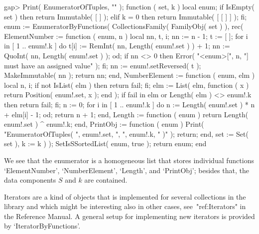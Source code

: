 \beginexample
gap> Print( EnumeratorOfTuples, "\n" );
function ( set, k )
    local  enum;
    if IsEmpty( set )  then
        return Immutable( [  ] );
    elif k = 0  then
        return Immutable( [ [  ] ] );
    fi;
    enum := EnumeratorByFunctions( CollectionsFamily( FamilyObj( set ) ), rec(
          ElementNumber := function ( enum, n )
                local  nn, t, i;
                nn := n - 1;
                t := [  ];
                for i  in [ 1 .. enum!.k ]  do
                    t[i] := RemInt( nn, Length( enum!.set ) ) + 1;
                    nn := QuoInt( nn, Length( enum!.set ) );
                od;
                if nn <> 0  then
                    Error( "<enum>[", n, "] must have an assigned value" );
                fi;
                nn := enum!.set{Reversed( t )};
                MakeImmutable( nn );
                return nn;
            end,
          NumberElement := function ( enum, elm )
                local  n, i;
                if not IsList( elm )  then
                    return fail;
                fi;
                elm := List( elm, function ( x )
                        return Position( enum!.set, x );
                    end );
                if fail in elm or Length( elm ) <> enum!.k  then
                    return fail;
                fi;
                n := 0;
                for i  in [ 1 .. enum!.k ]  do
                    n := Length( enum!.set ) * n + elm[i] - 1;
                od;
                return n + 1;
            end,
          Length := function ( enum )
                return Length( enum!.set ) ^ enum!.k;
            end,
          PrintObj := function ( enum )
                Print( "EnumeratorOfTuples( ", enum!.set, ", ", enum!.k, " )" 
                 );
                return;
            end,
          set := Set( set ),
          k := k ) );
    SetIsSSortedList( enum, true );
    return enum;
end
\endexample

We see that the enumerator is a homogeneous list that stores individual
functions `ElementNumber', `NumberElement', `Length', and `PrintObj';
besides that, the data components $S$ and $k$ are contained.



Iterators are a kind of objects that is implemented for several collections
in the {\GAP} library and which might be interesting also in other cases,
see~"ref:Iterators" in the {\GAP} Reference Manual.
A general setup for implementing new iterators is provided by
`IteratorByFunctions'.

